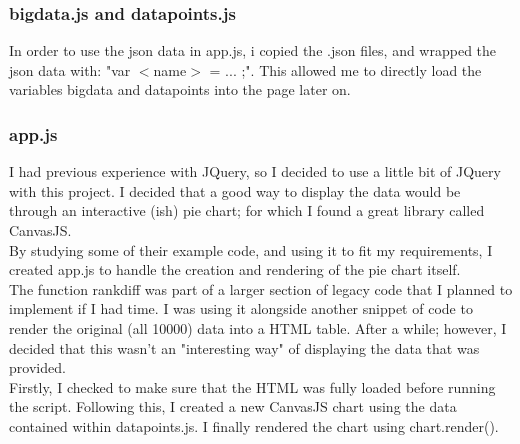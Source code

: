 \documentclass{article}
\begin{document}
\subsubsection{bigdata.js and datapoints.js}
In order to use the json data in app.js, i copied the .json files, and wrapped the json data with: "var $<$name$>$ = ... ;". This allowed me to directly load the variables bigdata and datapoints into the page later on.

\subsubsection{app.js}
I had previous experience with JQuery, so I decided to use a little bit of JQuery with this project. I decided that a good way to display the data would be through an interactive (ish) pie chart; for which I found a great library called CanvasJS. 
\\ \newline
By studying some of their example code, and using it to fit my requirements, I created app.js to handle the creation and rendering of the pie chart itself.
\\ \newline
The function rankdiff was part of a larger section of legacy code that I planned to implement if I had time. I was using it alongside another snippet of code to render the original (all 10000) data into a HTML table. After a while; however, I decided that this wasn't an "interesting way" of displaying the data that was provided.
\\ \newline
Firstly, I checked to make sure that the HTML was fully loaded before running the script. Following this, I created a new CanvasJS chart using the data contained within datapoints.js. I finally rendered the chart using chart.render(). 
\\ \newline
\end{document}
